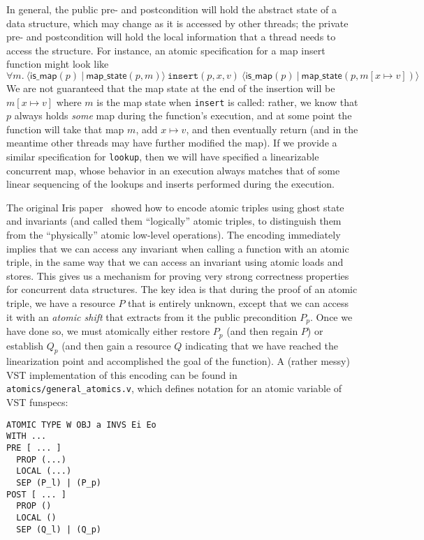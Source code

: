 \documentclass[11pt]{article} %
\begin{document}
In general, the public pre- and postcondition will hold the abstract state of a data structure, which may change as it is accessed by other threads; the private pre- and postcondition will hold the local information that a thread needs to access the structure. For instance, an atomic specification for a map insert function might look like $$\forall m.\ \langle \mathsf{is\_map}(p)\ |\ \mathsf{map\_state}(p, m)\rangle\ \texttt{insert}(p, x, v)\ \langle \mathsf{is\_map}(p)\ |\ \mathsf{map\_state}(p, m[x \mapsto v])\rangle$$
We are not guaranteed that the map state at the end of the insertion will be $m[x \mapsto v]$ where $m$ is the map state when \texttt{insert} is called: rather, we know that $p$ always holds \emph{some} map during the function's execution, and at some point the function will take that map $m$, add $x \mapsto v$, and then eventually return (and in the meantime other threads may have further modified the map). If we provide a similar specification for \texttt{lookup}, then we will have specified a linearizable concurrent map, whose behavior in an execution always matches that of some linear sequencing of the lookups and inserts performed during the execution.

The original Iris paper~\cite{iris1} showed how to encode atomic triples using ghost state and invariants (and called them ``logically'' atomic triples, to distinguish them from the ``physically'' atomic low-level operations). The encoding immediately implies that we can access any invariant when calling a function with an atomic triple, in the same way that we can access an invariant using atomic loads and stores. This gives us a mechanism for proving very strong correctness properties for concurrent data structures. The key idea is that during the proof of an atomic triple, we have a resource $P$ that is entirely unknown, except that we can access it with an \emph{atomic shift} that extracts from it the public precondition $P_p$. Once we have done so, we must atomically either restore $P_p$ (and then regain $P$) or establish $Q_p$ (and then gain a resource $Q$ indicating that we have reached the linearization point and accomplished the goal of the function). A (rather messy) VST implementation of this encoding can be found in \texttt{atomics/general\_atomics.v}, which defines notation for an atomic variable of VST funspecs:

\begin{verbatim}
ATOMIC TYPE W OBJ a INVS Ei Eo
WITH ...
PRE [ ... ]
  PROP (...)
  LOCAL (...)
  SEP (P_l) | (P_p)
POST [ ... ]
  PROP ()
  LOCAL ()
  SEP (Q_l) | (Q_p)
\end{verbatim}
\end{document}
